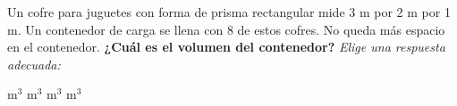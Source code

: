 Un cofre para juguetes con forma de prisma rectangular mide 3 m por 2 m por 1
m.
Un contenedor de carga se llena con 8 de estos cofres. No queda más espacio en
el contenedor.
\textbf{¿Cuál es el volumen del contenedor?}
\emph{Elige una respuesta adecuada:}

\begin{choices}
     m$^3$
     m$^3$
     m$^3$
     m$^3$
\end{choices}